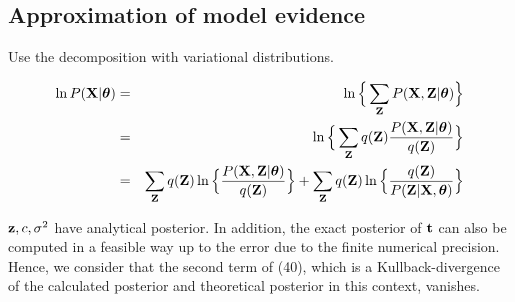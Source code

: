 \documentclass{article}
\begin{document}
	\subsection{Approximation of model evidence}
	Use the decomposition with variational distributions.
	
	\begin{eqnarray}
		\ln P(\bold{X}|\boldsymbol{\theta}) &=& \ln \Big\{\sum_\bold{Z}P(\bold{X}, \bold{Z} | \boldsymbol{\theta}) \Big\} \nonumber \\
		&=& \ln \Big\{\sum_\bold{Z}q(\bold{Z})\frac{P(\bold{X}, \bold{Z}|\boldsymbol{\theta})}{q(\bold{Z})} \Big\} \nonumber \\
		&=& \sum_\bold{Z}q(\bold{Z})\ln \Big\{ \frac{P(\bold{X}, \bold{Z}| \boldsymbol{\theta})}{q(\bold{Z})} \Big\} + \sum_\bold{Z}q(\bold{Z})\ln \Big\{ \frac{q(\bold{Z})}{P(\bold{Z}|\bold{X}, \boldsymbol{\theta})} \Big\}
	\end{eqnarray}
	
	$\bold{z}, c, \sigma^2$ have analytical posterior. In addition, the exact posterior of $\bold{t}$ can also be computed in a feasible way up to the error due to the finite numerical precision. Hence, we consider that the second term of (40), which is a Kullback-divergence of the calculated posterior and theoretical posterior in this context, vanishes.
	
\end{document}
